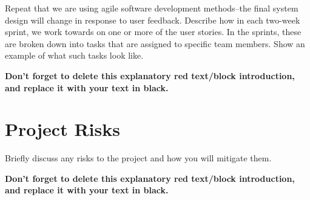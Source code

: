 \begin{tcolorbox}[      %
    boxrule=0pt,        %
    colback=white,      %
    coltext=red         %
]                       %
    Repeat that we are using agile software development methods--the final system design will change in response to user feedback. Describe how in each two-week sprint, we work towards on one or more of the user stories. In the sprints, these are broken down into tasks that are assigned to specific team members. Show an example of what such tasks look like. 
    
    \vspace{15pt}       %
    \begin{center}      %
    \textbf{Don't forget to delete this explanatory red text/block introduction, and replace it with your text in black.}
    \end{center}        %
\end{tcolorbox}         %

\section{Project Risks} %

\begin{tcolorbox}[      %
    boxrule=0pt,        %
    colback=white,      %
    coltext=red         %
]                       %
    Briefly discuss any risks to the project and how you will mitigate them.
    
    \vspace{15pt}       %
    \begin{center}      %
    \textbf{Don't forget to delete this explanatory red text/block introduction, and replace it with your text in black.}
    \end{center}        %
\end{tcolorbox}         %